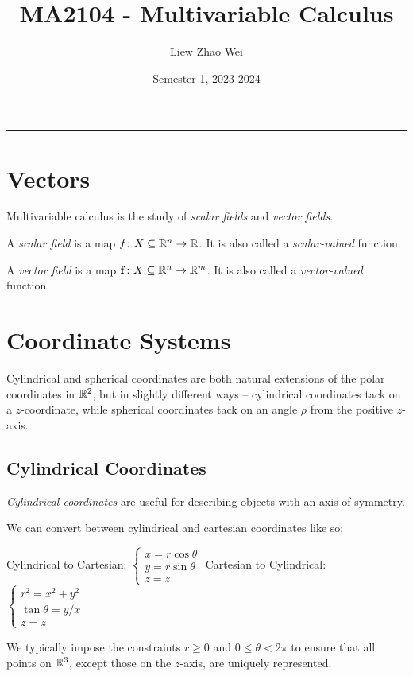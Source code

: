 \documentclass{article}
\title{MA2104 - Multivariable Calculus}
\author{Liew Zhao Wei}
\date{Semester 1, 2023-2024}
\begin{document}
\maketitle
\hrule

\section{Vectors}

Multivariable calculus is the study of \emph{scalar fields} and \emph{vector fields}.

\begin{definition}
  A \emph{scalar field} is a map $f \colon X \subseteq \mathbb{R}^n \to \mathbb{R}$.
  It is also called a \emph{scalar-valued} function.
\end{definition}

\begin{definition}
  A \emph{vector field} is a map $\mathbf{f} \colon X \subseteq \mathbb{R}^n \to \mathbb{R}^m$.
  It is also called a \emph{vector-valued} function.
\end{definition}

\section{Coordinate Systems}

Cylindrical and spherical coordinates are both natural extensions of the polar coordinates in $\mathbb{R}^2$, but in slightly different ways -- cylindrical coordinates tack on a $z$-coordinate, while spherical coordinates tack on an angle $\rho$ from the positive $z$-axis.

\subsection{Cylindrical Coordinates}

\emph{Cylindrical coordinates} are useful for describing objects with an axis of symmetry.

\begin{definition}
  We can convert between cylindrical and cartesian coordinates like so:

  Cylindrical to Cartesian: $
    \begin{cases}
      x  = r\cos\theta
      \\
      y  = r\sin\theta
      \\
      z = z
    \end{cases}
  $
  Cartesian to Cylindrical: $
    \begin{cases}
      r^2 = x^2 + y^2
      \\
      \tan{\theta}  = y / x
      \\
      z = z
    \end{cases}
  $
\end{definition}
We typically impose the constraints $r \geq 0$ and $0 \leq \theta < 2\pi$ to ensure that all points on $\mathbb{R}^3$, except those on the $z$-axis, are uniquely represented.
\end{document}
